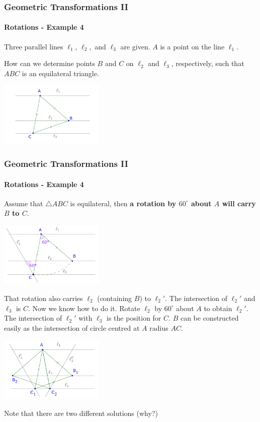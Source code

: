 \documentclass[8pt,xcolor=table,dvipsnames]{beamer}
\newcommand{\dg}{^\circ}
\begin{document}
\begin{frame}[t]
    \frametitle{Geometric Transformations II}
    \framesubtitle{Rotations - Example 4}
    \begin{example}
        Three parallel lines $\ell_1$, $\ell_2,$ and $\ell_3$ are given. $A$ is a point on the line $\ell_1$.
        
        \bigbreak
        How can we determine points $B$ and $C$ on $\ell_2$ and $\ell_3$, respectively, such that $ABC$ is an equilateral triangle.
    \end{example}

    \begin{center}
        \includegraphics[width=5cm]{./svg/pdf/rotation-4a.pdf}
    \end{center}
\end{frame}

\begin{frame}[t]
    \frametitle{Geometric Transformations II}
    \framesubtitle{Rotations - Example 4}
    \begin{overprint}
        Assume that $\triangle ABC$ is equilateral, then \textbf{a rotation by $60\dg$ about $A$ will carry $B$ to $C$}.
        \begin{center}
            \includegraphics[width=5cm]{./svg/pdf/rotation-4b.pdf}
        \end{center}
        That rotation also carries $\ell_2$  (containing $B$) to $\ell_2'$. The intersection of $\ell_2'$ and $\ell_3$ is $C.$
        Now we know how to do it. Rotate $\ell_2$ by $60\dg$ about $A$ to obtain $\ell_2'$.
        The intersection of $\ell_2'$ with $\ell_3$ is the position for $C.$
        $B$ can be constructed easily as the intersection of circle centred at $A$ radius $AC.$
        \begin{center}
            \includegraphics[width=5cm]{./svg/pdf/rotation-4c.pdf}
        \end{center}
    
        \bigbreak
        Note that there are two different solutions (why?)
    \end{overprint}
\end{frame}
\end{document}
